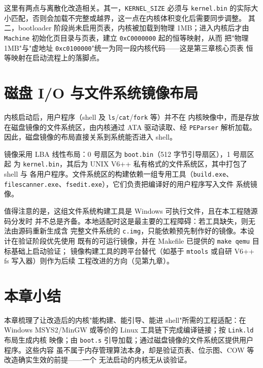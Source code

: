 这里有两点与离散化改造相关。其一，\texttt{KERNEL\_SIZE} 必须与 \texttt{kernel.bin}
的实际大小匹配，否则会加载不完整或越界，这一点在内核体积变化后需要同步调整。
其二，bootloader 阶段尚未启用页表，内核被加载到物理 1MB；进入内核后才由
\texttt{Machine} 初始化页目录与页表，建立 \texttt{0xC0000000} 起的恒等映射，从而
把"物理 1MB"与"虚地址 \texttt{0xc0100000}"统一为同一段内核代码——这是第三章核心页表
恒等映射在启动流程上的落脚点。

\section{磁盘 I/O 与文件系统镜像布局}
内核启动后，用户程序（shell 及 \texttt{ls}/\texttt{cat}/\texttt{fork} 等）并不在
内核映像中，而是存放在磁盘镜像的文件系统区，由内核通过 ATA 驱动读取、经
\texttt{PEParser} 解析加载。因此，磁盘镜像的布局直接关系到系统能否进入 shell。

镜像采用 LBA 线性布局：0 号扇区为 \texttt{boot.bin}（512 字节引导扇区），1 号扇区起
为 \texttt{kernel.bin}，其后为 UNIX V6++ 私有格式的文件系统区，其中打包了 shell 与
各用户程序。文件系统区的构建依赖一组专用工具（\texttt{build.exe}、
\texttt{filescanner.exe}、\texttt{fsedit.exe}），它们负责把编译好的用户程序写入文件
系统镜像。

值得注意的是，这组文件系统构建工具是 Windows 可执行文件，且在本工程随源码分发时
并不总是齐备。本地适配时这是最主要的工程障碍：若工具缺失，则无法由源码重新生成含
完整文件系统的 \texttt{c.img}，只能依赖预先制作好的镜像。本设计在验证阶段优先使用
既有的可运行镜像，并在 Makefile 已提供的 \texttt{make qemu} 目标基础上启动验证；
镜像构建工具的跨平台替代（如基于 \texttt{mtools} 或自研 V6++ fs 写入器）则作为后续
工程改进的方向（见第九章）。

\section{本章小结}
本章梳理了让改造后的内核"能构建、能引导、能进 shell"所需的工程适配：在 Windows
MSYS2/MinGW 或等价的 Linux 工具链下完成编译链接；按 \texttt{Link.ld} 布局生成内核
映像；由 \texttt{boot.s} 引导加载；通过磁盘镜像的文件系统区提供用户程序。这些内容
虽不属于内存管理算法本身，却是验证页表、位示图、COW 等改造确实生效的前提——一个
无法启动的内核无从谈验证。
